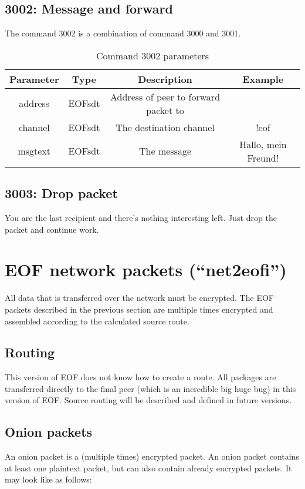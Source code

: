\documentclass[12pt,a4paper]{book}
\begin{document}
\subsection{3002: Message and forward}
The command 3002 is a combination of command 3000 and 3001.
%
\begin{longtable}{|c|c|c|c|}
\caption{Command 3002 parameters}\\
\hline
\textbf{Parameter} & \textbf{Type} & \textbf{Description} & \textbf{Example}\\
\hline
address & EOFsdt & Address of peer to forward packet to&\\
\hline
channel & EOFsdt & The destination channel & !eof\\
\hline
msgtext & EOFsdt & The message & Hallo, mein Freund!\\
\hline
\end{longtable}
\subsection{3003: Drop packet}
You are the last recipient and there's nothing interesting left.
Just drop the packet and continue work.
\section{EOF network packets ("`net2eofi"')}
All data that is transferred over the network must be encrypted.
The EOF packets described in the previous section are multiple times
encrypted and assembled according to the calculated source route.
\subsection{Routing}
This version of EOF does not know how to create a route.
All packages are transferred directly to the final peer (which is an
incredible big huge bug) in this version of EOF. Source routing will be
described and defined in future versions.
\subsection{Onion packets}
An onion packet is a (multiple times) encrypted packet.
An onion packet contains at least one plaintext packet, but can also contain
already encrypted packets. It may look like as follows:
\end{document}
